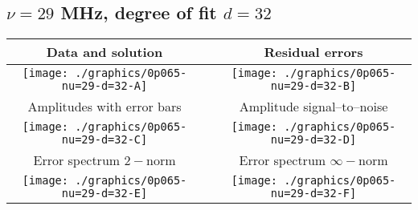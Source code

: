 

% 

\clearpage{}
\break{}

\subsection{$\nu = 29$ MHz, degree of fit $d = 32$}

\begin{table}[h]
    \begin{center}
        \begin{tabular}{ccc}
            Data and solution & \quad & Residual errors \\\hline
            \texttt{[image: ./graphics/0p065-nu=29-d=32-A]} &&
            \texttt{[image: ./graphics/0p065-nu=29-d=32-B]} \\[15pt]
            Amplitudes with error bars && Amplitude signal--to--noise \\\hline
            \texttt{[image: ./graphics/0p065-nu=29-d=32-C]} &&
            \texttt{[image: ./graphics/0p065-nu=29-d=32-D]} \\[15pt]
            Error spectrum $2-$norm && Error spectrum $\infty-$norm \\\hline
            \texttt{[image: ./graphics/0p065-nu=29-d=32-E]} &&
            \texttt{[image: ./graphics/0p065-nu=29-d=32-F]} \\[15pt]
        \end{tabular}
    \end{center}
\label{fig:elev=65, nu=29}
\end{table}



\endinput
